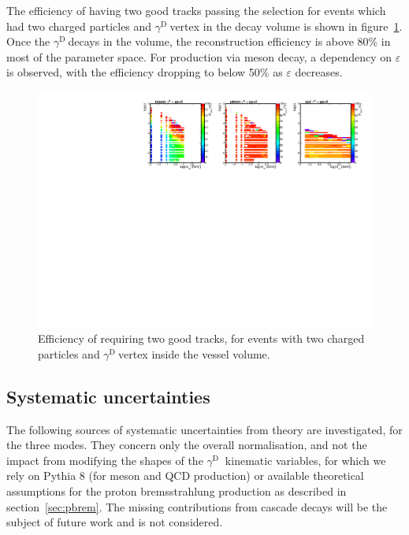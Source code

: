 \documentclass[12pt,a4paper,]{article}
\newcommand{\mathDP}{\gamma^{\mathrm{D}}\ }
\newcommand{\DP}{$\mathDP$}
\begin{document}
The efficiency of having two good tracks passing the selection for
events which had two charged particles and \DP vertex in the decay
volume is shown in figure~\ref{fig:Preco}. Once the \DP decays in the
volume, the reconstruction efficiency is above 80\% in most of the
parameter space. For production via meson decay, a dependency on
$\varepsilon$ is observed, with the efficiency dropping to below 50\%
as $\varepsilon$ decreases.

\begin{figure}[h!]
  \centering
\includegraphics[width=1.\textwidth]{figures/EffRecovs2DMassEps_all.pdf}
\caption{Efficiency of requiring two good tracks, for events with two
  charged particles and \DP vertex inside the vessel volume.}
\label{fig:Preco}
\end{figure}

  
\subsection{Systematic uncertainties}

The following sources of systematic uncertainties from theory are
investigated, for the three modes. They concern only the overall
normalisation, and not the impact from modifying the shapes of the \DP
kinematic variables, for which we rely on Pythia 8 (for meson and QCD
production) or available theoretical assumptions for the proton
bremsstrahlung production as described in section~\ref{sec:pbrem}. The
missing contributions from cascade decays will be the subject of future
work and is not considered.
\end{document}
